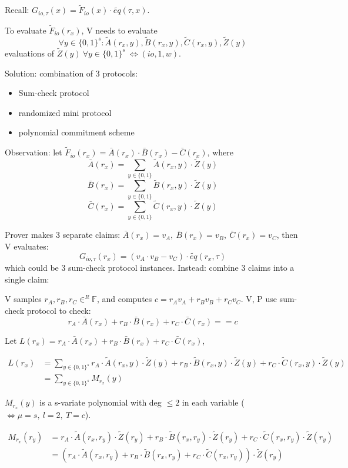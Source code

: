 \documentclass{article}
\theoremstyle{definition}
\begin{document}
Recall: $G_{io, \tau}(x) = \widetilde{F}_{io}(x) \cdot \widetilde{eq}(\tau, x)$.

To evaluate $\widetilde{F}_{io}(r_x)$, V needs to evaluate
$$\forall y \in \{0,1\}^s: \widetilde{A}(r_x, y), \widetilde{B}(r_x, y), \widetilde{C}(r_x, y), \widetilde{Z}(y)$$
evaluations of $\widetilde{Z}(y) ~\forall y \in \{0,1\}^s ~\Longleftrightarrow (io, 1, w)$.

Solution: combination of 3 protocols:
\begin{itemize}
	\item Sum-check protocol
	\item randomized mini protocol
	\item polynomial commitment scheme
\end{itemize}

Observation: let $\widetilde{F}_{io}(r_x) = \bar{A}(r_x) \cdot \bar{B}(r_x) - \bar{C}(r_x)$, where
$$\bar{A}(r_x) = \sum_{y \in \{0,1\}} \widetilde{A}(r_x, y) \cdot \widetilde{Z}(y)$$
$$\bar{B}(r_x) = \sum_{y \in \{0,1\}} \widetilde{B}(r_x, y) \cdot \widetilde{Z}(y)$$
$$\bar{C}(r_x) = \sum_{y \in \{0,1\}} \widetilde{C}(r_x, y) \cdot \widetilde{Z}(y)$$

Prover makes 3 separate claims: $\bar{A}(r_x)=v_A,~ \bar{B}(r_x)=v_B,~ \bar{C}(r_x)=v_C$,
then V evaluates:
$$G_{io, \tau}(r_x) = (v_A \cdot v_B - v_C) \cdot \widetilde{eq}(r_x, \tau)$$
which could be 3 sum-check protocol instances. Instead: combine 3 claims into a single claim:

V samples $r_A, r_B, r_C \in^R \mathbb{F}$, and computes $c= r_A v_A + r_B v_B + r_C v_C$.
V, P use sum-check protocol to check:
$$r_A \cdot \bar{A}(r_x) + r_B \cdot \bar{B}(r_x) + r_C \cdot \bar{C}(r_x) == c$$


Let $L(r_x) = r_A \cdot \bar{A}(r_x) +r_B \cdot \bar{B}(r_x) +r_C \cdot \bar{C}(r_x)$,

\begin{align*}
	L(r_x) &= \sum_{y \in \{0,1\}^s}
	       r_A \cdot \widetilde{A}(r_x, y) \cdot \widetilde{Z}(y)
+ r_B \cdot \widetilde{B}(r_x, y) \cdot \widetilde{Z}(y)
+ r_C \cdot \widetilde{C}(r_x, y) \cdot \widetilde{Z}(y)\\
	       &= \sum_{y \in \{0,1\}^s} M_{r_x}(y)
\end{align*}

$M_{r_x}(y)$ is a s-variate polynomial with deg $\leq 2$ in each variable ($\Longleftrightarrow \mu = s,~ l=2,~ T=c$).


\begin{align*}
M_{r_x}(r_y) &=
r_A \cdot \widetilde{A}(r_x, r_y) \cdot \widetilde{Z}(r_y)
+ r_B \cdot \widetilde{B}(r_x, r_y) \cdot \widetilde{Z}(r_y)
+ r_C \cdot \widetilde{C}(r_x, r_y) \cdot \widetilde{Z}(r_y)\\
	     &=
	     (r_A \cdot \widetilde{A}(r_x, r_y)
+ r_B \cdot \widetilde{B}(r_x, r_y)
+ r_C \cdot \widetilde{C}(r_x, r_y)) \cdot \widetilde{Z}(r_y)\\
\end{align*}
\end{document}
